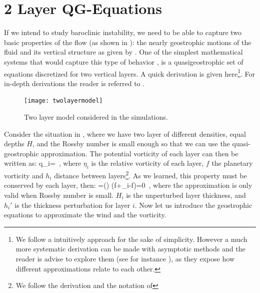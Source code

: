 \section{2 Layer QG-Equations}
\label{s:qg}

If we intend to study baroclinic instability, we need to be able to
capture two basic properties of the flow (as shown in
): the nearly geostrophic motions of the fluid and
its vertical structure as given by . One of
the simplest mathematical systems that would capture this type of
behavior , is a quasigeostrophic set of equations
discretized for two vertical layers. A quick derivation is given
here\footnote{
    We follow a intuitively approach for the sake of simplicity. However
    a much more systematic derivation can be made with asymptotic methods
    and the reader is advise to explore them (see for instance
    ), as they expose how different
    approximations relate to each other.
}. For in-depth derivations the  reader is referred to
.

\begin{figure}[t]
\begin{center}
    \texttt{[image: twolayermodel]}
\end{center}
\caption{Two layer model considered in the simulations.}
\label{f:twolayer}
\end{figure}

Consider the situation in , where we have two layer of
different densities, equal depths $H$, and the Rossby number is small
enough so that we can use the quasi-geostrophic approximation. The
potential vorticity of each layer can then be written as:
\beq
q_i=
\,,
where $\eta_i$ is the relative vorticity of each layer, $f$ the planetary
vorticity and $h_i$ distance between layers\footnote{
    We follow the derivation and the notation of 
}. As we learned, this
property must be conserved by each layer, then:
\beq
{}=\left(\right)
   \simeq {}\left(f+\eta_i-f\right)=0
\,,
where the approximation is only valid when Rossby number is small. $H_i$
is the unperturbed layer thickness, and $h_i'$ is the thickness
perturbation for layer $i$. Now let us introduce the geostrophic
equations to approximate the wind and the vorticity.

